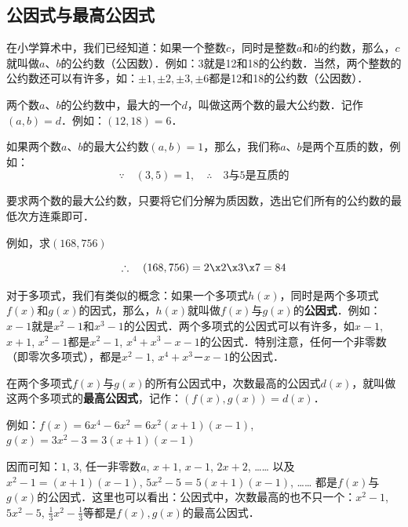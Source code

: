 \subsection{公因式与最高公因式}
在小学算术中，我们已经知道：如果一个整数$c$，同时是整数$a$和$b$的约数，那么，$c$就叫做$a$、$b$的公约数（公因数）．例如：3就是12和18的公约数．当然，两个整数的公约数还可以有许多，如：$\pm 1,\pm 2,\pm 3,\pm 6$都是12和18的公约数（公因数）．

两个数$a$、$b$的公约数中，最大的一个$d$，叫做这两个数的最大公约数．记作$(a,b)=d$．例如：$(12, 18)=6$．

如果两个数$a$、$b$的最大公约数$(a,b)=1$，那么，我们称$a$、$b$是两个互质的数，例如：
\[\because\quad (3,5)=1,\quad \therefore\quad \text{3与5是互质的}\]

要求两个数的最大公约数，只要将它们分解为质因数，选出它们所有的公约数的最低次方连乘即可．

例如，求$(168,756)$
\begin{center}
\end{center}
\[\therefore \quad (168, 756)=2\x 2\x 3\x 7=84\]

对于多项式，我们有类似的概念：如果一个多项式$h(x)$，同时是两个多项式$f(x)$和$g(x)$的因式，那么，$h(x)$就叫做$f(x)$与$g(x)$的\textbf{公因式}．例如：$x-1$就是$x^2-1$和$x^3-1$的公因式．两个多项式的公因式可以有许多，如$x-1$, $x+1$, $x^2-1$都是$x^2-1$, $x^4+x^3-x-1$的公因式．特别注意，任何一个非零数（即零次多项式），都是$x^2-1$, $x^4+x^3－x-1$的公因式．

在两个多项式$f(x)$与$g(x)$的所有公因式中，次数最高的公因式$d(x)$，就叫做这两个多项式的\textbf{最高公因式}，记作：$(f(x),g(x))=d(x)$．

例如：$f(x)=6x^4-6x^2=6x^2(x+1)(x-1)$, 
$g (x) =3x^2-3=3 (x+1) (x-1)$

因而可知：$1$, $3$, 任一非零数$a$, $x+1$, $x-1$, $2x+2$, …… 以及$x^2-1=(x+1)(x-1)$, $5x^2-5=5(x+1)(x-1)$, …… 都是$f(x)$与$g(x)$的公因式．这里也可以看出：公因式中，次数最高的也不只一个：$x^2-1$,$5x^2-5$, $\frac{1}{3}x^2-\frac{1}{3}$等都是$f(x),g(x)$的最高公因式．

